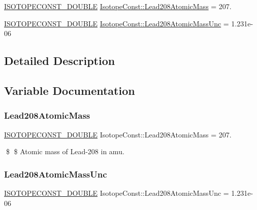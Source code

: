 \begin{DoxyCompactItemize}
\item 
\mbox{\hyperlink{group___isotope_const-_macros_ga8f45a7272ce02c0b4c65c44636ed719a}{I\+S\+O\+T\+O\+P\+E\+C\+O\+N\+S\+T\+\_\+\+D\+O\+U\+B\+LE}} \mbox{\hyperlink{group___isotope_const-_lead-_pb208_ga90649bfa0c6d488e903f09cf38633c52}{Isotope\+Const\+::\+Lead208\+Atomic\+Mass}} = 207.
\item 
\mbox{\hyperlink{group___isotope_const-_macros_ga8f45a7272ce02c0b4c65c44636ed719a}{I\+S\+O\+T\+O\+P\+E\+C\+O\+N\+S\+T\+\_\+\+D\+O\+U\+B\+LE}} \mbox{\hyperlink{group___isotope_const-_lead-_pb208_gab70cdc5f7e44c81a0acdc5a806228b8e}{Isotope\+Const\+::\+Lead208\+Atomic\+Mass\+Unc}} = 1.\+231e-\/06
\end{DoxyCompactItemize}


\subsection{Detailed Description}


\subsection{Variable Documentation}
\mbox{\label{group___isotope_const-_lead-_pb208_ga90649bfa0c6d488e903f09cf38633c52}} 
\subsubsection{\texorpdfstring{Lead208\+Atomic\+Mass}{Lead208AtomicMass}}
{\footnotesize\ttfamily \mbox{\hyperlink{group___isotope_const-_macros_ga8f45a7272ce02c0b4c65c44636ed719a}{I\+S\+O\+T\+O\+P\+E\+C\+O\+N\+S\+T\+\_\+\+D\+O\+U\+B\+LE}} Isotope\+Const\+::\+Lead208\+Atomic\+Mass = 207.}

\$ \$ Atomic mass of Lead-\/208 in amu. \mbox{\label{group___isotope_const-_lead-_pb208_gab70cdc5f7e44c81a0acdc5a806228b8e}} 
\subsubsection{\texorpdfstring{Lead208\+Atomic\+Mass\+Unc}{Lead208AtomicMassUnc}}
{\footnotesize\ttfamily \mbox{\hyperlink{group___isotope_const-_macros_ga8f45a7272ce02c0b4c65c44636ed719a}{I\+S\+O\+T\+O\+P\+E\+C\+O\+N\+S\+T\+\_\+\+D\+O\+U\+B\+LE}} Isotope\+Const\+::\+Lead208\+Atomic\+Mass\+Unc = 1.\+231e-\/06}

